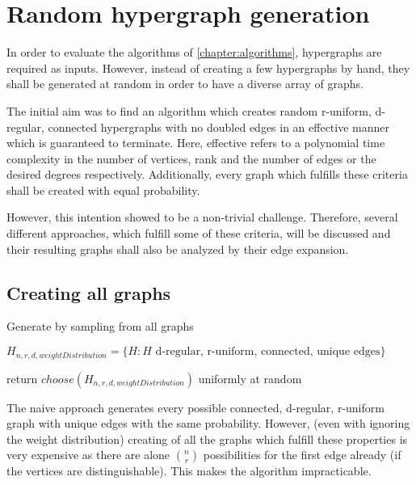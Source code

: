 \chapter{Random hypergraph generation }\label{chapter:random_hypergraphs}
In order to evaluate the algorithms of \cref{chapter:algorithms}, hypergraphs are required as inputs. However, instead of creating a few hypergraphs by hand, they shall be generated at random in order to have a diverse array of graphs.

The initial aim was to find an algorithm which creates random r-uniform, d-regular, connected hypergraphs with no doubled edges in an effective manner which is guaranteed to terminate. Here, effective refers to a polynomial time complexity in the number of vertices, rank and the number of edges or the desired degrees respectively. Additionally, every graph which fulfills these criteria shall be created with equal probability.

However, this intention showed to be a non-trivial challenge. Therefore, several different approaches, which fulfill some of these criteria, will be discussed and their resulting graphs shall also be analyzed by their edge expansion.
\section{Creating all graphs}

\begin{algorithm}[htpb]
	\caption{Generate by sampling from all graphs\label{alg:sample_all_graphs}} 
	\begin{algorithmic}
		\State $H_{n,r,d,  weightDistribution} = \{H: H\text{ d-regular, r-uniform, connected, unique edges}\}$
	
		\State return $ choose(H_{n,r,d,  weightDistribution})$ \Comment uniformly at random
		\EndFunction 
	\end{algorithmic}
\end{algorithm}	
The naive approach generates every possible connected, d-regular, r-uniform graph with unique edges with the same probability. However, (even with ignoring the weight distribution) creating of all the graphs which fulfill these properties is very expensive as there are alone $n \choose r$ possibilities for the first edge already (if the vertices are distinguishable). This makes the algorithm impracticable. 

